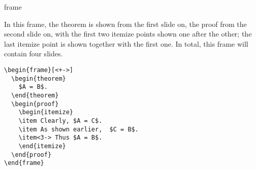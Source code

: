 \begin{environment}{{frame}%
    }
\begin{frame}[<+->][plain]
\begin{frame}[plain]
  \example In this frame, the theorem is shown from the first slide
  on, the proof from the second slide on, with the first two itemize
  points shown one after the other; the last itemize point is shown
  together with the first one. In total, this frame will contain four
  slides.
\begin{verbatim}
\begin{frame}[<+->]
  \begin{theorem}
    $A = B$.
  \end{theorem}
  \begin{proof}
    \begin{itemize}
    \item Clearly, $A = C$.
    \item As shown earlier,  $C = B$.
    \item<3-> Thus $A = B$.
    \end{itemize}
  \end{proof}
\end{frame}
\end{verbatim}
 

\end{frame}
\end{frame}
\end{environment}
